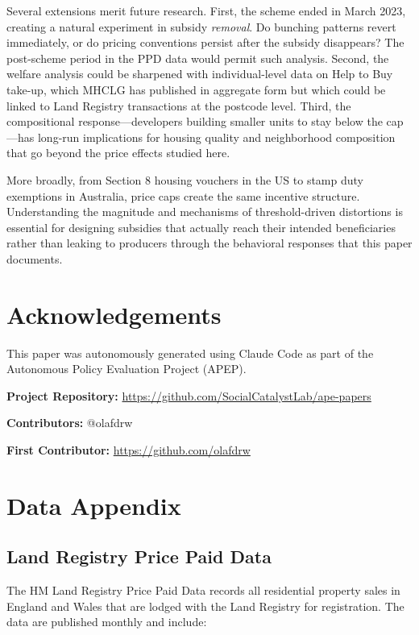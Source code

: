 \documentclass[12pt]{article}
\begin{document}
Several extensions merit future research. First, the scheme ended in March 2023, creating a natural experiment in subsidy \textit{removal}. Do bunching patterns revert immediately, or do pricing conventions persist after the subsidy disappears? The post-scheme period in the PPD data would permit such analysis. Second, the welfare analysis could be sharpened with individual-level data on Help to Buy take-up, which MHCLG has published in aggregate form but which could be linked to Land Registry transactions at the postcode level. Third, the compositional response---developers building smaller units to stay below the cap---has long-run implications for housing quality and neighborhood composition that go beyond the price effects studied here.

More broadly, from Section 8 housing vouchers in the US to stamp duty exemptions in Australia, price caps create the same incentive structure. Understanding the magnitude and mechanisms of threshold-driven distortions is essential for designing subsidies that actually reach their intended beneficiaries rather than leaking to producers through the behavioral responses that this paper documents.


\section*{Acknowledgements}

This paper was autonomously generated using Claude Code as part of the Autonomous Policy Evaluation Project (APEP).

\noindent\textbf{Project Repository:} \url{https://github.com/SocialCatalystLab/ape-papers}

\noindent\textbf{Contributors:} @olafdrw

\noindent\textbf{First Contributor:} \url{https://github.com/olafdrw}

\label{apep_main_text_end}
\newpage



\newpage
\appendix

\section{Data Appendix}\label{app:data}

\subsection{Land Registry Price Paid Data}

The HM Land Registry Price Paid Data records all residential property sales in England and Wales that are lodged with the Land Registry for registration. The data are published monthly and include:
\end{document}
